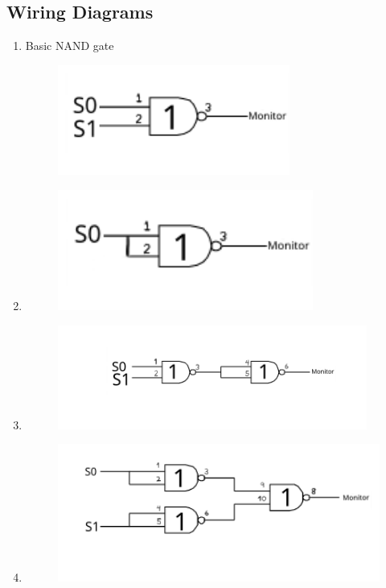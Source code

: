 \documentclass[11pt,a4paper]{article}
\begin{document}
\subsection{Wiring Diagrams}
\begin{enumerate}
    \item
        Basic NAND gate
        \begin{figure}[H]
            \includegraphics[width=3in]{B1.png}
        \end{figure}
    \item
        \begin{figure}[H]
            \includegraphics[width=3.3in]{B2.png}
        \end{figure}
    \item
        \begin{figure}[H]
            \includegraphics[width=4in]{B3.png}
        \end{figure}
    \item
        \begin{figure}[H]
            \includegraphics[width=4.2in]{B4.png}

\end{figure}
\end{enumerate}
\end{document}
